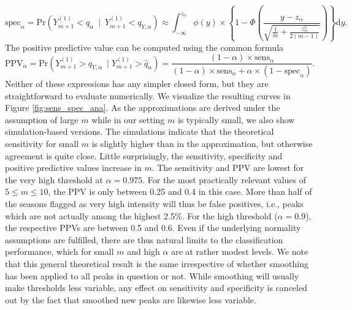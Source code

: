 \documentclass{article}
\begin{document}
\begin{equation}
\text{spec}_\alpha = \text{Pr}(Y_{m + 1}^{(1)} < \hat{q}_\alpha \ \mid \ Y_{m + 1}^{(1)} < q_{Y, \alpha}) \approx \int_{-\infty}^{z_\alpha}\phi(y) \times \left\{1 - \Phi\left(\frac{y - z_\alpha}{\sqrt{\frac{1}{m} + \frac{z_\alpha^2}{2(m - 1)}}}\right)\right\} \text{d}y.
\label{eq:spec}
\end{equation}
The positive predictive value can be computed using the common formula
\begin{equation}
\text{PPV}_\alpha = \text{Pr}(Y_{m + 1}^{(1)} > q_{Y, \alpha} \ \mid Y_{m + 1}^{(1)} > \hat{q}_\alpha) = \frac{(1 - \alpha) \times \text{sens}_\alpha}{(1 - \alpha) \times \text{sens}_\alpha + \alpha \times (1 - \text{spec}_\alpha)}.
\label{eq:ppv}
\end{equation}
Neither of these expressions has any simpler closed form, but they are straightforward to evaluate numerically. We visualize the resulting curves in Figure \ref{fig:sens_spec_ana}. As the approximations are derived under the assumption of large $m$ while in our setting $m$ is typically small, we also show simulation-based versions. The simulations indicate that the theoretical sensitivity for small $m$ is slightly higher than in the approximation, but otherwise agreement is quite close. Little surprisingly, the sensitivity, specificity and positive predictive values increase in $m$. The sensitivity and PPV are lowest for the very high threshold at $\alpha = 0.975$. For the most practically relevant values of $5 \leq m \leq 10$, the PPV is only between 0.25 and 0.4 in this case. More than half of the seasons flagged as very high intensity will thus be false positives, i.e., peaks which are not actually among the highest 2.5\%. For the high threshold ($\alpha = 0.9$), the respective PPVs are between 0.5 and 0.6. Even if the underlying normality assumptions are fulfilled, there are thus natural limits to the classification performance, which for small $m$ and high $\alpha$ are at rather modest levels. We note that this general theoretical result is the same irrespective of
 whether smoothing has been applied to all peaks in question or not. While smoothing will usually make thresholds less variable, any effect on sensitivity and specificity is canceled out by the fact that smoothed new peaks are likewise less variable.
\end{document}
